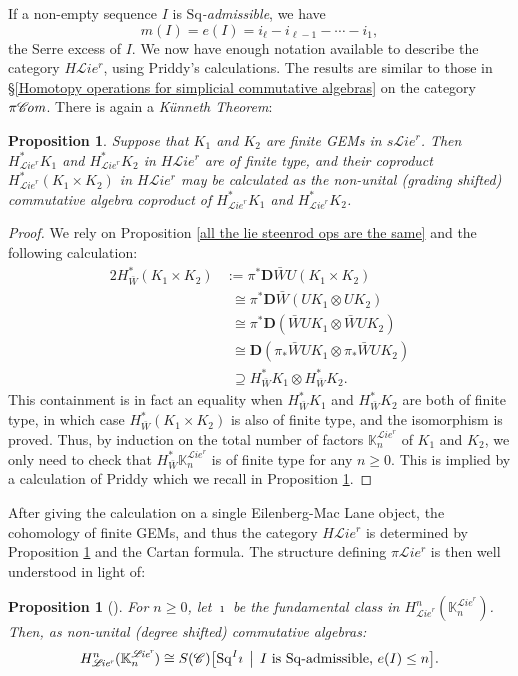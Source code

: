 \documentclass[11pt]{amsart} \renewcommand{\baselinestretch}{1.2}
\theoremstyle{plain}
\newtheorem{prop}[thm]{Proposition}
\numberwithin{equation}{section} %
\theoremstyle{plain}
\newtheorem{prop}[thm]{Proposition}
\numberwithin{equation}{chapter} %
\newcommand{\scrL}{\mathscr{L}}
\newcommand{\scrC}{\mathscr{C}}
\newcommand{\citeBOX}[2][]{\cite[\mbox{#1}]{#2}}
\newcommand{\CommOperad}{{\scrC}}
\newcommand{\PA}[1]{\pi#1}
\newcommand{\HA}[1]{H#1}
\newcommand{\minDimDelta}{m}
\newcommand{\Sq}{\mathrm{Sq}}
\newcommand{\algs}{{\scrC\!\textit{\normalfont\textit{om}}}}
\newcommand{\restliealgs}{{\scrL\!\textit{ie}^\textit{r}}}
\newcommand{\dual}{\mathbf{D}}
\begin{document}
\begin{Constructing cohomology operations}
If a non-empty sequence $I$  is \emph{$\Sq$-admissible}, we have 
\[\minDimDelta(I)=e(I)=i_\ell-i_{\ell-1}-\cdots -i_1,\]
the Serre excess of $I$. We now have enough notation available to describe the category $\HA{\restliealgs}$, using Priddy's calculations. The results are similar to those in \S\ref{Homotopy operations for simplicial commutative algebras} on the category $\PA{\algs}$.
There is again  a \emph{K\"unneth Theorem}:
\begin{prop}
\label{Prop on cohomology of product of finite lie gems}
Suppose that $K_1$ and $K_2$ are finite GEMs in $s\restliealgs$. Then $H^*_\restliealgs K_1$ and $H^*_\restliealgs K_2$ in $\HA{\restliealgs}$ are of finite type, and their coproduct
$H^*_\restliealgs(K_1\times K_2)$ in $\HA{\restliealgs}$ may be calculated as the non-unital (grading shifted) commutative algebra coproduct of $H^*_\restliealgs K_1$ and $H^*_\restliealgs K_2$.
\end{prop}
\begin{proof}
We rely on Proposition \ref{all the lie steenrod ops are the same} and the following calculation:
\begin{alignat*}{2}
H^*_{\bar{W}}(K_1\times K_2)
&:=
\pi^*\dual \bar{W}U(K_1\times K_2)%
\\
&\phantom{:}\cong
\pi^*\dual \bar{W}(UK_1\otimes UK_2)%
\\
&\phantom{:}\cong
\pi^*\dual (\bar{W}UK_1\otimes \bar{W}UK_2)%
\\
&\phantom{:}\cong
\dual (\pi_*\bar{W}UK_1\otimes \pi_*\bar{W}UK_2)%
\\
&\phantom{:}\supseteq
H^*_{\bar{W}}K_1\otimes H^*_{\bar{W}}K_2.
\end{alignat*}
This containment is in fact an equality when $H^*_{\bar{W}}K_1 $ and $H^*_{\bar{W}}K_2$ are both of finite type, in which case $H^*_{\bar{W}}(K_1\times K_2)$ is also of finite type, and the isomorphism is proved. Thus, by induction on the total number of factors $\mathbb{K}_n^{\restliealgs}$ of $K_1$ and $K_2$, we only need to check that $H^*_{\bar{W}}\mathbb{K}_n^{\restliealgs}$ is of finite type for any $n\geq0$. This is implied by a calculation of Priddy \citeBOX[6.1]{PriddySimplicialLie.pdf} which we recall in Proposition \ref{calc of restliecoh on single EMobject}.
\end{proof}
\noindent After giving the calculation on a single Eilenberg-Mac Lane object, the cohomology of finite GEMs, and thus the category $\HA{\restliealgs}$ is determined by Proposition \ref{Prop on cohomology of product of finite lie gems} and the Cartan formula. The structure defining $\PA{\restliealgs}$ is then well understood in light of:
\begin{prop}[{\citeBOX[6.1]{PriddySimplicialLie.pdf}}]
\label{calc of restliecoh on single EMobject}
For $n\geq0$, let $\imath$ be the fundamental class in $H^n_{\restliealgs}(\mathbb{K}_n^{\restliealgs})$. Then, as non-unital (degree shifted) commutative algebras:
\[H^n_{\restliealgs}(\mathbb{K}_n^{\restliealgs})\cong S(\CommOperad)\bigl[\Sq^I\imath\,\bigm|\,\textup{$I$ is $\Sq$-admissible, $e(I)\leq n$}\bigr].\]
\end{prop}


\end{Constructing cohomology operations}
\end{document}

